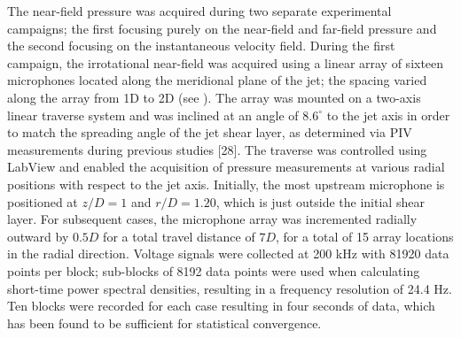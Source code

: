 The near-field pressure was acquired  during two separate experimental campaigns; the first focusing purely on the near-field and far-field pressure and the second focusing on the instantaneous velocity field. During the first campaign, the irrotational near-field was acquired using a linear array of sixteen microphones located along the meridional plane of the jet; the spacing varied along the array from 1D to 2D (see ). 
The array was mounted on a two-axis linear traverse system and was inclined at an angle of $8.6^\circ$ to the jet axis in order to match the spreading angle of the jet shear layer, as determined via PIV measurements during previous studies [28]. 
The traverse was controlled using LabView and enabled the acquisition of pressure measurements at various radial positions with respect to the jet axis. 
Initially, the most upstream microphone is positioned at $z/D = 1$ and $r/D = 1.20$, which is just outside the initial shear layer.
For subsequent cases, the microphone array was incremented radially outward by $0.5D$ for a total travel distance of $7D$, for a total of 15 array locations in the radial direction.
Voltage signals were collected at 200 kHz with 81920 data points per block; sub-blocks of 8192 data points were used when calculating short-time power spectral densities, resulting in a frequency resolution of 24.4 Hz. 
Ten blocks were recorded for each case resulting in four seconds of data, which has been found to be sufficient for statistical convergence.
